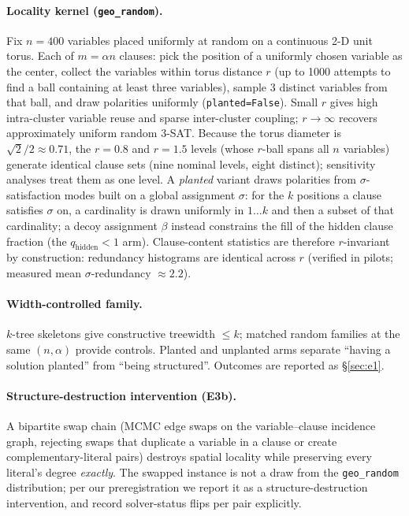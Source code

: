 \documentclass[pdflatex,sn-basic,Numbered]{sn-jnl}
\begin{document}
\paragraph{Locality kernel (\texttt{geo\_random}).}
Fix $n=400$ variables placed uniformly at random on a continuous 2-D unit
torus. Each of $m=\alpha n$ clauses: pick the position of a uniformly chosen
variable as the center, collect the
variables within torus distance $r$ (up to 1000 attempts to find a ball
containing at least three variables), sample 3 distinct variables from that
ball, and draw polarities uniformly
(\texttt{planted=False}). Small $r$ gives high intra-cluster variable reuse
and sparse inter-cluster coupling; $r\to\infty$ recovers approximately uniform
random 3-SAT. Because the torus diameter is ${\sqrt{2}}/{2}\approx0.71$, the
$r{=}0.8$ and $r{=}1.5$ levels (whose $r$-ball spans all $n$ variables)
generate identical clause sets (nine nominal levels, eight distinct);
sensitivity analyses treat them as one level.
A \emph{planted} variant draws polarities from
$\sigma$-satisfaction modes built on a global assignment $\sigma$: for the
$k$ positions a clause satisfies $\sigma$ on, a cardinality is drawn uniformly
in $1\ldots k$ and then a subset of that cardinality; a decoy assignment
$\beta$ instead constrains the fill of the hidden clause fraction (the
$q_{\text{hidden}}<1$ arm). Clause-content statistics are therefore
$r$-invariant by construction: redundancy histograms are identical across $r$
(verified in pilots; measured mean $\sigma$-redundancy ${\approx}2.2$).

\paragraph{Width-controlled family.}
$k$-tree skeletons give constructive treewidth $\le k$; matched random
families at the same $(n,\alpha)$ provide controls. Planted and unplanted arms
separate ``having a solution planted'' from ``being structured''. Outcomes are
reported as \S\ref{sec:e1}.

\paragraph{Structure-destruction intervention (E3b).}
A bipartite swap chain (MCMC edge swaps on the variable--clause incidence
graph, rejecting swaps that duplicate a variable in a clause or create
complementary-literal pairs) destroys spatial locality while preserving every
literal's degree \emph{exactly}. The swapped instance is not a draw from the
\texttt{geo\_random} distribution; per our preregistration we report it as a
structure-destruction intervention, and record solver-status flips per pair
explicitly.
\end{document}
